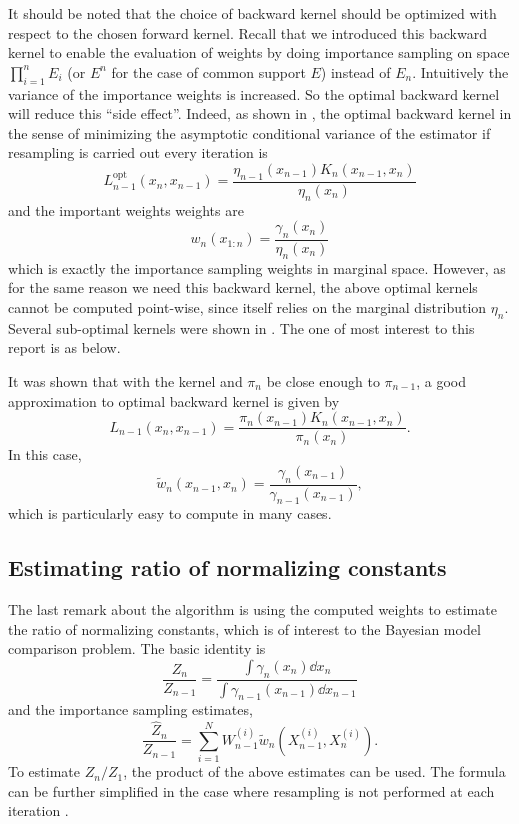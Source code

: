 It should be noted that the choice of backward kernel should be optimized
with respect to the chosen forward kernel. Recall that we introduced this
backward kernel to enable the evaluation of weights by doing importance
sampling on space $\prod_{i=1}^n E_i$ (or $E^n$ for the case of common
support $E$) instead of $E_n$. Intuitively the variance of the importance
weights is increased. So the optimal backward kernel will reduce this ``side
effect''. Indeed, as shown in \textcite{DelMoral2006}, the optimal backward
kernel in the sense of minimizing the asymptotic conditional variance of the
estimator if resampling is carried out every iteration is
\begin{equation}
  L_{n-1}^{\mathrm{opt}}(x_n,x_{n-1})
  = \frac{\eta_{n-1}(x_{n-1})K_n(x_{n-1},x_n)}{\eta_n(x_n)}
\end{equation}
and the important weights weights are
\begin{equation}
  w_n(x_{1:n}) = \frac{\gamma_n(x_n)}{\eta_n(x_n)}
\end{equation}
which is exactly the importance sampling weights in marginal space. However,
as for the same reason we need this backward kernel, the above optimal
kernels cannot be computed point-wise, since itself relies on the marginal
distribution $\eta_n$. Several sub-optimal kernels were shown in
\textcite{DelMoral2006}. The one of most interest to this report is as
below.

It was shown that with the \mcmc kernel and $\pi_n$ be close enough to
$\pi_{n-1}$, a good approximation to optimal backward kernel is given by
\begin{equation}
  L_{n-1}(x_n,x_{n-1})
  = \frac{\pi_n(x_{n-1})K_n(x_{n-1},x_n)}{\pi_n(x_n)}.
\end{equation}
In this case,
\begin{equation}
  \tilde{w}_n(x_{n-1},x_n)
  = \frac{\gamma_n(x_{n-1})}{\gamma_{n-1}(x_{n-1})},
\end{equation}
which is particularly easy to compute in many cases.

\subsection{Estimating ratio of normalizing constants}
\label{sub:Estimating ratio of normalizing constants}

The last remark about the \smc algorithm is using the computed weights to
estimate the ratio of normalizing constants, which is of interest to the
Bayesian model comparison problem. The basic identity is
\begin{equation}
  \frac{Z_n}{Z_{n-1}} =
  \frac{\int\gamma_n(x_n)\dd x_n}{\int\gamma_{n-1}(x_{n-1})\dd x_{n-1}}
\end{equation}
and the importance sampling estimates,
\begin{equation}
  \frac{\hat{Z}_n}{Z_{n-1}} =
  \sum_{i=1}^NW_{n-1}^{(i)}\tilde{w}_n(X_{n-1}^{(i)},X_n^{(i)}).
  \label{eq:z_smc}
\end{equation}
To estimate $Z_n/Z_1$, the product of the above estimates can be used. The
formula can be further simplified in the case where resampling is not
performed at each iteration \parencite{DelMoral2006}.

